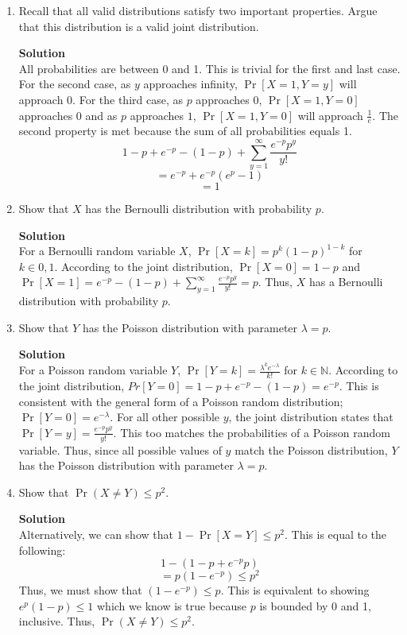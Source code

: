 \documentclass[11pt]{article}
\newenvironment{Parts}{\begin{enumerate}[label=(\alph*)]}{\end{enumerate}}
\newcommand*{\Part}{\item}
\newenvironment{Answer}{\vspace{10pt}\begin{mdframed}\textbf{Solution}\\}{\end{mdframed}\vfill\pagebreak[3]}
\newenvironment{Answer}{\vspace{10pt}}{\vfill\pagebreak[3]}
\newcommand*{\N}{\mathbb{N}}
\begin{document}
\begin{Parts}
    \Part Recall that all valid distributions satisfy two important properties. Argue that this distribution is a valid joint distribution.
	\begin{Answer}
     All probabilities are between 0 and 1. This is trivial for the first and last case. For the second case, as $y$ approaches infinity, $\Pr[X=1, Y=y]$ will approach 0. For the third case, as $p$ approaches 0, $\Pr[X=1, Y=0]$ approaches 0 and as $p$ approaches $1$, $\Pr[X=1, Y=0]$ will approach $\frac{1}{e}$. The second property is met because the sum of all probabilities equals 1.
    $$1-p+e^{-p}-(1-p)+\sum_{y=1}^{\infty}\frac{e^{-p}p^y}{y!}$$
    $$=e^{-p}+e^{-p}(e^{p}-1)$$
    $$=1$$
	\end{Answer}

    \Part Show that $X$ has the Bernoulli distribution with probability $p$.
	\begin{Answer}
    For a Bernoulli random variable $X$, $\Pr[X=k]=p^k(1-p)^{1-k}$ for $k \in {0,1}$. According to the joint distribution, $\Pr[X=0]=1-p$ and $\Pr[X=1]=e^{-p}-(1-p)+\sum_{y=1}^{\infty}\frac{e^{-p}p^y}{y!}=p$. Thus, $X$ has a Bernoulli distribution with probability $p$. 
	\end{Answer}

    \Part Show that $Y$ has the Poisson distribution with parameter $\lambda = p$.
	\begin{Answer}
    For a Poisson random variable $Y$, $\Pr[Y=k]=\frac{\lambda^ke^{-\lambda}}{k!}$ for $k \in \N$. According to the joint distribution, $Pr[Y=0]=1-p+e^{-p}-(1-p)=e^{-p}$. This is consistent with the general form of a Poisson random distribution; $\Pr[Y=0]= e^{-\lambda}$. For all other possible $y$, the joint distribution states that $\Pr[Y=y]=
\frac{e^{-p} p^y}{y!}$. This too matches the probabilities of a Poisson random variable. Thus, since all possible values of $y$ match the Poisson distribution, $Y$ has the Poisson distribution with parameter $\lambda=p$.
\end{Answer}

    \Part Show that $\Pr(X \neq Y) \leq p^2$.
	\begin{Answer}
    Alternatively, we can show that $1-\Pr[X=Y] \leq p^2$. This is equal to the following: $$1-(1-p+e^{-p}p)$$
    $$=p(1-e^{-p}) \leq p^2$$
    Thus, we must show that $(1-e^{-p})\leq p$. This is equivalent to showing $e^p(1-p) \leq 1$ which we know is true because $p$ is bounded by 0 and 1, inclusive. Thus, $\Pr(X \neq Y) \leq p^2$.
	\end{Answer}
\end{Parts}
\end{document}
